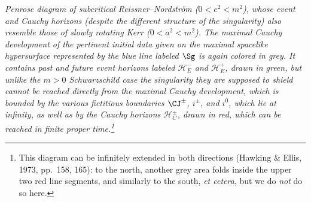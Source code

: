 \documentclass[12pt]{article}
\begin{document}
\emph{  Penrose diagram of subcritical Reissner--Nordstr\"{o}m  ($0<e^2<m^2$), whose event and Cauchy horizons (despite the different structure of the singularity) also resemble those of slowly rotating Kerr ($0<a^2<m^2$). The  maximal Cauchy development of the pertinent initial data given on the maximal spacelike hypersurface represented by the blue line labeled $\Sg$ is again colored in grey. It contains past and future event horizons labeled  $\mathcal{H}_E^-$ and $\mathcal{H}_E^+$, drawn in green, but unlike  the $m>0$ Schwarzschild case  the singularity they are supposed to shield cannot be reached directly from the  maximal Cauchy development, which is bounded by the various fictitious boundaries $\CJ^{\pm}$, $i^{\pm}$, and $i^0$, which lie at infinity, as well as by the Cauchy horizons  $\mathcal{H}_C^{\pm}$, drawn in red, which can be reached in finite proper time.\footnote{ 
This diagram can be infinitely extended  in both directions (Hawking \& Ellis, 1973, pp.\ 158, 165): to the north, another grey area folds inside the upper two red line segments, and similarly to the south, \emph{et cetera}, but we do \emph{not} do so here.}}
\end{document}
